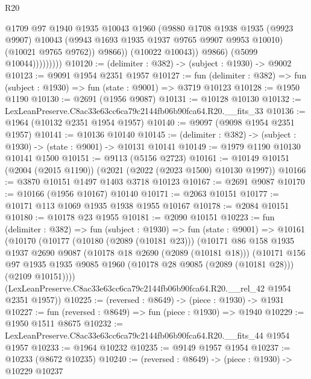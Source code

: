 \begin{lexlean}{R20}
\begin{coremodule}
                            @1709
                            @97
                            @1940
                            @1935
                            @10043
                            @1960
                            (@9880
                              @1708
                              @1938
                              @1935
                              (@9923 @9907)
                              @10043
                              (@9943 @1693 @1935 @1937 @9765 @9907 @9953 @10010)
                              (@10021 @9765 @9762))
                            @9866))
                        (@10022 @10043))
                      @9866)
                    (@5099 @10044)))))))))
@10120 := (delimiter : @382) -> (subject : @1930) -> @9002
@10123 := @9091 @1954 @2351 @1957
@10127 := fun (delimiter : @382) => fun (subject : @1930) => fun (state : @9001) => @3719 @10123
@10128 := @1950 @1190
@10130 := @2691 (@1956 @9087)
@10131 := @10128 @10130
@10132 := LexLeanPreserve.C8ac33e63cc6ca79c2144fb06b90fca64.R20.__fits_33
@10136 := @1964 (@10132 @2351 @1954 @1957)
@10140 := @9097 (@9098 @1954 @2351 @1957)
@10141 := @10136 @10140
@10145 := (delimiter : @382) -> (subject : @1930) -> (state : @9001) -> @10131 @10141
@10149 := @1979 @1190 @10130 @10141 @1500
@10151 := @9113 (@5156 @2723)
@10161 := @10149 @10151 (@2004 (@2015 @1190)) (@2021 (@2022 (@2023 @1500) @10130 @1997))
@10166 := @3870 @10151 @1497 @1403 @3718 @10123
@10167 := @2691 @9087
@10170 := @10166 (@1956 @10167) @10140
@10171 := @2063 @10151
@10177 := @10171 @113 @1069 @1935 @1938 @1955 @10167
@10178 := @2084 @10151
@10180 := @10178 @23 @1955
@10181 := @2090 @10151
@10223 := fun (delimiter : @382) =>
  fun (subject : @1930) =>
  fun (state : @9001) =>
  @10161
    (@10170
      (@10177
        (@10180 (@2089 (@10181 @23)))
        (@10171
          @86
          @158
          @1935
          @1937
          @2690
          @9087
          (@10178 @18 @2690 (@2089 (@10181 @18)))
          (@10171
            @156
            @97
            @1935
            @1935
            @9085
            @1960
            (@10178 @28 @9085 (@2089 (@10181 @28)))
            (@2109 @10151))))
      (LexLeanPreserve.C8ac33e63cc6ca79c2144fb06b90fca64.R20.__rel_42 @1954 @2351 @1957))
@10225 := (reversed : @8649) -> (piece : @1930) -> @1931
@10227 := fun (reversed : @8649) => fun (piece : @1930) => @1940
@10229 := @1950 @1511 @8675
@10232 := LexLeanPreserve.C8ac33e63cc6ca79c2144fb06b90fca64.R20.__fits_44 @1954 @1957
@10233 := @1964 @10232
@10235 := @9149 @1957 @1954
@10237 := @10233 (@8672 @10235)
@10240 := (reversed : @8649) -> (piece : @1930) -> @10229 @10237

\end{coremodule}
\end{lexlean}
